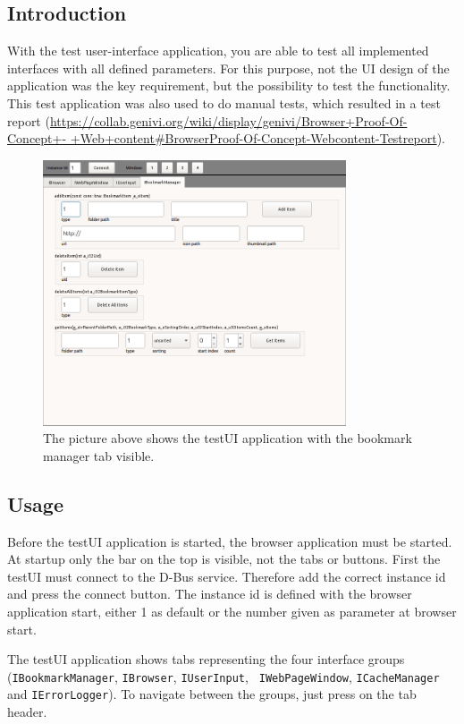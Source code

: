 \documentclass{pelagicore}
\begin{document}
\subsection{Introduction}
With the test user-interface application, you are able to test all implemented
interfaces with all defined parameters. For this purpose, not the UI design of
the application was the key requirement, but the possibility to test the
functionality. This test application was also used to do manual tests, which
resulted in a test report
(\url{https://collab.genivi.org/wiki/display/genivi/Browser+Proof-Of-Concept+-
+Web+content#BrowserProof-Of-Concept-Webcontent-Testreport}).

\begin{figure}[!ht]
    \center
    \includegraphics[width=0.8\textwidth]{testui.png}
    \caption{The picture above shows the testUI application with the bookmark
             manager tab visible.}
\end{figure}

\subsection{Usage}
Before the testUI application is started, the browser application must be
started. At startup only the bar on the top is visible, not the tabs or
buttons. First the testUI must connect to the D-Bus service. Therefore add the
correct instance id and press the connect button. The instance id is defined
with the browser application start, either 1 as default or the number given as
parameter at browser start.

The testUI application shows tabs representing the four interface groups
({\tt IBook\-mark\-Manager}, {\tt IBrowser}, {\tt IUserInput}, {\tt
IWebPageWindow}, {\tt ICacheManager} and {\tt IErrorLogger}). To navigate
between the groups, just press on the tab header.
\end{document}
